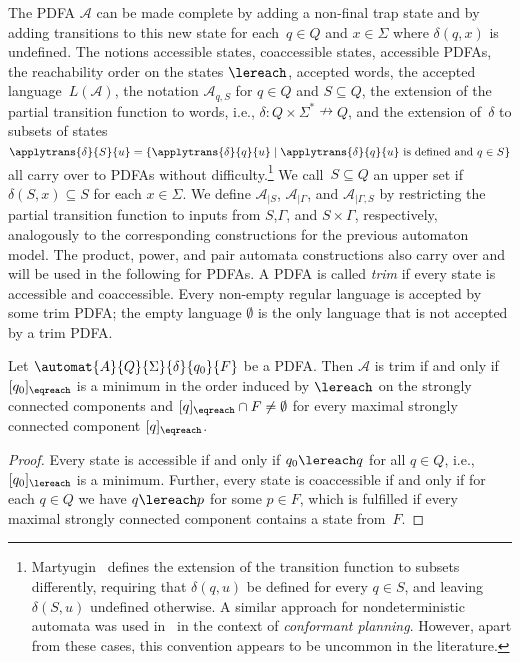 The PDFA $\mathcal A$ can be made complete by adding a non-final trap state
and by adding transitions to this new state for each~$q \in Q$ and $x \in \Sigma$
where $\delta(q, x)$ is undefined.
The notions accessible states, coaccessible states, accessible PDFAs, the reachability order on the states $\lereach$, accepted words,
the accepted language~$L(\mathcal A)$, the notation $\mathcal A_{q,S}$ for $q \in Q$ and $S \subseteq Q$, 
the extension of the partial transition function to words, i.e., 
$\delta \colon Q \times \Sigma^* \nrightarrow Q$, and the extension of~$\delta$ to subsets of states 
$\applytrans{\delta}{S}{u} = \{ \applytrans{\delta}{q}{u} \mid \applytrans{\delta}{q}{u} \text{ is defined and } q \in S \}$
all carry over to PDFAs without difficulty.\footnote{Martyugin~\cite{Martyugin14} defines the extension of the transition function to subsets differently, requiring that $\delta(q,u)$ be defined for every $q \in S$, and leaving $\delta(S,u)$ undefined otherwise. A similar approach for nondeterministic automata was used in~\cite[Sec.~8]{DBLP:conf/aaai/ArrighiFO023} in the context of \emph{conformant planning}. However, apart from these cases, this convention appears to be uncommon in the literature.}
We call~$S \subseteq Q$ an upper set if $\delta(S, x) \subseteq S$ for each $x \in \Sigma$.
We define $\mathcal A_{|S}$, $\mathcal A_{|\Gamma}$,
and $\mathcal A_{|\Gamma,S}$ by restricting the partial transition
function to inputs from $S$,$\Gamma$, and $S \times \Gamma$, respectively,
analogously to the corresponding constructions for the previous automaton model.
The product, power, and pair automata constructions also carry over and will be used in the following
for PDFAs.
A PDFA is called \emph{trim} if every state is accessible and coaccessible. Every non-empty regular language is accepted by some trim PDFA; the empty language $\emptyset$ is the only language that is not accepted by a trim PDFA.

\begin{proposition}
	\label{constrsync:prop:trim}
	Let $\automat{A}{Q}{\Sigma}{\delta}{q_0}{F}$
	be a PDFA. Then $\mathcal A$
	is trim if and only if~$[q_0]_{\eqreach}$
	is a minimum in the order induced by $\lereach$
	on the strongly connected components
	and $[q]_{\eqreach} \cap F \ne \emptyset$
	for every maximal strongly connected component $[q]_{\eqreach}$.	
\end{proposition}
\begin{proof}
	Every state is accessible if and only if $q_0 \lereach q$ for all $q \in Q$, i.e., $[q_0]_{\lereach}$
	is a minimum.
	Further, every state is coaccessible
	if and only if for each $q \in Q$ 
	we have $q \lereach p$ for some $p \in F$,
	which is fulfilled if every maximal strongly connected component contains a state from~$F$.
\end{proof}

